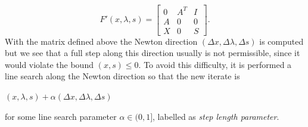 \documentclass[a4paper,10 pt,titlepage,twoside]{book}
\theoremstyle{plain}
\theoremstyle{definition}
\theoremstyle{remark}
\begin{document}
 \begin{equation*}
 F'(x,\lambda,s)=\begin{bmatrix}
 0&A^{T}&I \\A&0&0\\X&0&S
 \end{bmatrix}.
 \end{equation*}
With the matrix defined above the Newton direction $(\Delta x, \Delta \lambda, \Delta s)$ is computed but we see that a full step along this direction usually is not permissible, since it would violate the bound $(x,s)\leq 0 $. To avoid this difficulty, it is performed a line search along the Newton direction so that the new iterate is
\begin{center}
	$(x,\lambda,s)+\alpha (\Delta x, \Delta \lambda, \Delta s)$
\end{center}
for some line search parameter $\alpha\in(0,1]$, labelled as \textit{step length parameter}.
\end{document}
